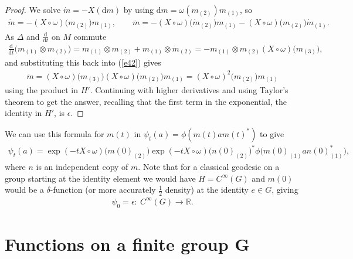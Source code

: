 \documentclass[10pt,a4paper]{amsart}
\numberwithin{equation}{section}
\newcommand{\extd}{\mathrm{d}}
\newcommand{\tens}{\mathop{\otimes}}
\newcommand{\R}{\mathbb{R}}
\newcommand{\<}{\langle}
\renewcommand{\>}{\rangle}
\begin{document}
\begin{proof}
	We solve $ \dot{m}=-X (\extd m ) $ by using $ \extd m= \omega (m_{(2)}) m_{(1)}$, so
	\begin{gather}\label{e42}
	\dot{m}=- (X \circ\omega )\big(m_{(2)}\big) m_{(1)},\qquad	\ddot{m}=- ( X\circ\omega )\big(\dot{m}_{(2)}\big) m_{(1)} - ( X\circ\omega ) \big(m_{(2)}\big) \dot{m}_{(1)}.
	\end{gather}
	As $ \Delta $ and $ 	\frac{\extd}{\extd t} $ on $ M $ commute
	\begin{gather*}
	\frac{\extd}{\extd t} \big(m_{(1)} \tens m_{(2)}\big) =\dot {m}_{(1)} \tens m_{(2)}+ m_{(1)} \tens \dot {m}_{(2)}=- m_{(1)}\tens m_{(2)} ( X\circ\omega )\big(m_{(3)}\big),
	\end{gather*}
	and substituting this back into (\ref{e42}) gives
	\begin{gather*}
	\ddot{m}=( X\circ\omega ) \big(m_{(3)}\big) ( X\circ\omega ) \big(m_{(2)}\big) m_{(1)} =( X\circ\omega )^{2}\big(m_{(2)}\big) m_{(1)}
	\end{gather*}
using the product in $ H'$. Continuing with higher derivatives and using Taylor's theorem to get the answer, recalling that the first term in the exponential, the identity in $ H' $, is $ \epsilon $.
\end{proof}


We can use this formula for $ m(t) $ in $ \psi_t(a)=\phi(m(t) a m(t)^{*}) $ to give
\begin{gather}\label{e68}
	\psi_t(a)=\exp (-tX \circ \omega) \big(m(0)_{(2)}\big) \exp (-tX \circ \omega) \big(n(0)_{(2)}\big) ^{*} \phi \big(m(0)_{(1)} a n (0)_{(1)}^{*}\big),
\end{gather}
where $ n $ is an independent copy of $m$. Note that for a classical geodesic on a group starting at the identity element we would have $ H= C^{\infty}(G) $ and $ m(0) $ would be a $ \delta $-function (or more accurately $ \frac{1}{2} $ density) at the identity $ e\in G $, giving
\begin{gather*}
	\psi_0= \epsilon\colon \ C^{\infty}(G) \rightarrow \R.
\end{gather*}

 \section[Functions on a finite group G]{Functions on a finite group $\boldsymbol{G}$} \label{S1}
\end{document}
